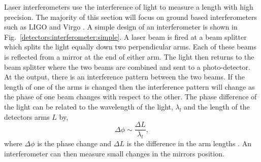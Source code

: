 Laser interferometers use the interference of light to measure a length with high precision.
The majority of this section will focus on ground based interferometers such as \gls{LIGO} and Virgo \citep{aasi2015AdvancedLIGO,acernese2015AdvancedVirgo}.
A simple design of an interferometer is shown in Fig.~\ref{detectors:interferometer:simple}. 
A laser beam is fired at a beam splitter which splits the light equally down two perpendicular arms. 
Each of these beams is reflected from a mirror at the end of either arm.
The light then returns to the beam splitter where the two beams are combined and sent to a photo-detector.
At the output, there is an interference pattern between the two beams.
If the length of one of the arms is changed then the interference pattern will change as the phase of one beam changes with respect to the other.
The phase difference of the light can be related to the wavelength of the light, $\lambda_l$ and the length of the detectors arms $L$ by,
\begin{equation}
\label{intro:detectors:phasechange}
\Delta \phi \sim \frac{\Delta L}{\lambda_l},
\end{equation}
where $\Delta \phi$ is the phase change and $\Delta L$ is the difference in the arm lengths \citep{brown2017ComparisonSelfselected}.
An interferometer can then measure small changes in the mirrors position.
